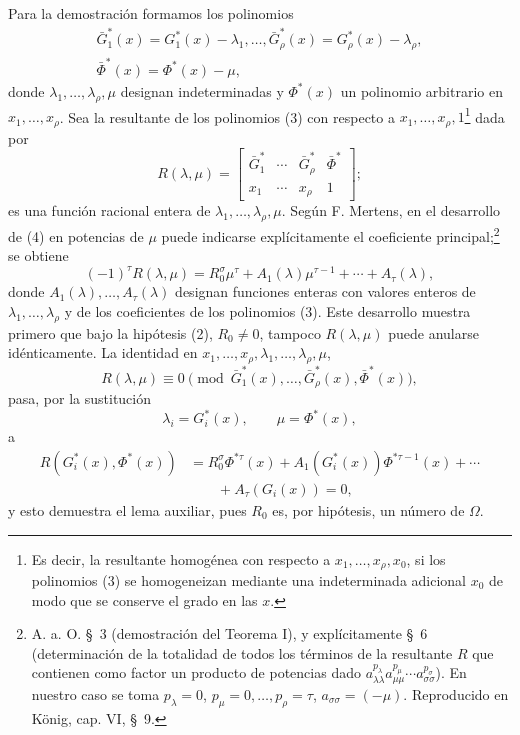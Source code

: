 \documentclass[11pt]{article}
\begin{document}
Para la demostración formamos los polinomios
\begin{equation}
\begin{gathered}
  \bar G_1^*(x)=G_1^*(x)-\lambda_1,
  \ldots,
  \bar G_\rho^*(x)=G_\rho^*(x)-\lambda_\rho,\\
  \bar\Phi^*(x)=\Phi^*(x)-\mu,
\end{gathered}
\tag{3}
\end{equation}
donde $\lambda_1,\ldots,\lambda_\rho,\mu$ designan indeterminadas y $\Phi^*(x)$ un polinomio arbitrario en $x_1,\ldots,x_\rho$. Sea la resultante de los polinomios (3) con respecto a $x_1,\ldots,x_\rho,1$\footnote{Es decir, la resultante homogénea con respecto a $x_1,\ldots,x_\rho,x_0$, si los polinomios (3) se homogeneizan mediante una indeterminada adicional $x_0$ de modo que se conserve el grado en las $x$.} dada por
\begin{equation}
  R(\lambda,\mu)=\left[
  \begin{array}{cccc}
   \bar G_1^*&\cdots&\bar G_\rho^*&\bar\Phi^*\\
   x_1&\cdots&x_\rho&1
  \end{array}
  \right];
\tag{4}
\end{equation}
es una función racional entera de $\lambda_1,\ldots,\lambda_\rho,\mu$. Según F. Mertens, en el desarrollo de (4) en potencias de $\mu$ puede indicarse explícitamente el coeficiente principal;\footnote{A. a. O. \S\ 3 (demostración del Teorema I), y explícitamente \S\ 6 (determinación de la totalidad de todos los términos de la resultante $R$ que contienen como factor un producto de potencias dado $a_{\lambda\lambda}^{p_\lambda}a_{\mu\mu}^{p_\mu}\cdots a_{\sigma\sigma}^{p_\sigma}$). En nuestro caso se toma $p_\lambda=0$, $p_\mu=0,\ldots,p_\rho=\tau$, $a_{\sigma\sigma}=(-\mu)$. Reproducido en König, cap. VI, \S\ 9.} se obtiene
\begin{equation}
  (-1)^\tau R(\lambda,\mu)
  =R_0^\sigma\mu^\tau+A_1(\lambda)\mu^{\tau-1}+\cdots+A_\tau(\lambda),
\tag{5}
\end{equation}
donde $A_1(\lambda),\ldots,A_\tau(\lambda)$ designan funciones enteras con valores enteros de $\lambda_1,\ldots,\lambda_\rho$ y de los coeficientes de los polinomios (3). Este desarrollo muestra primero que bajo la hipótesis (2), $R_0\ne0$, tampoco $R(\lambda,\mu)$ puede anularse idénticamente. La identidad en $x_1,\ldots,x_\rho,\lambda_1,\ldots,\lambda_\rho,\mu$,
\[
  R(\lambda,
\mu)\equiv 0\pmod{\bar G_1^*(x),\ldots,
\bar G_\rho^*(x),\bar\Phi^*(x)},
\]
pasa, por la sustitución
\[
  \lambda_i=G_i^*(x),\qquad \mu=\Phi^*(x),
\]
a
\begin{equation}
\begin{aligned}
  R(G_i^*(x),\Phi^*(x))
  &=R_0^\sigma\Phi^{*\tau}(x)
    +A_1(G_i^*(x))\Phi^{*\tau-1}(x)+\cdots \\
  &\qquad +A_\tau(G_i(x))=0,
\end{aligned}
\tag{6}
\end{equation}
y esto demuestra el lema auxiliar, pues $R_0$ es, por hipótesis, un número de $\Omega$.
\end{document}
